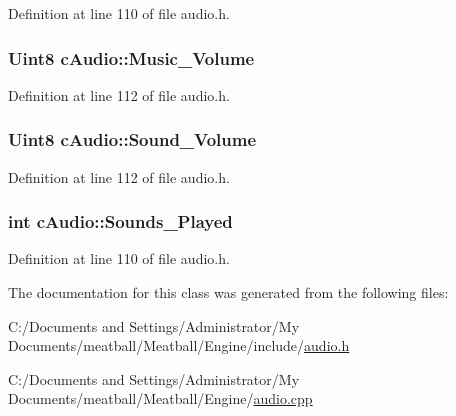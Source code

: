 Definition at line 110 of file audio.\-h.

\hypertarget{classc_audio_aa7d2c11847671823d34a694ad797bb75}{
\subsubsection[{Music\-\_\-\-Volume}]{\setlength{\rightskip}{0pt plus 5cm}Uint8 c\-Audio\-::\-Music\-\_\-\-Volume}}\label{classc_audio_aa7d2c11847671823d34a694ad797bb75}


Definition at line 112 of file audio.\-h.

\hypertarget{classc_audio_a3ac7aee05ebb4a7cdcfb5668226f6349}{
\subsubsection[{Sound\-\_\-\-Volume}]{\setlength{\rightskip}{0pt plus 5cm}Uint8 c\-Audio\-::\-Sound\-\_\-\-Volume}}\label{classc_audio_a3ac7aee05ebb4a7cdcfb5668226f6349}


Definition at line 112 of file audio.\-h.

\hypertarget{classc_audio_a9ec9fc3a055a17a90e5611570058487f}{
\subsubsection[{Sounds\-\_\-\-Played}]{\setlength{\rightskip}{0pt plus 5cm}int c\-Audio\-::\-Sounds\-\_\-\-Played}}\label{classc_audio_a9ec9fc3a055a17a90e5611570058487f}


Definition at line 110 of file audio.\-h.



The documentation for this class was generated from the following files\-:\begin{DoxyCompactItemize}
\item 
C\-:/\-Documents and Settings/\-Administrator/\-My Documents/meatball/\-Meatball/\-Engine/include/\hyperlink{audio_8h}{audio.\-h}\item 
C\-:/\-Documents and Settings/\-Administrator/\-My Documents/meatball/\-Meatball/\-Engine/\hyperlink{audio_8cpp}{audio.\-cpp}\end{DoxyCompactItemize}
